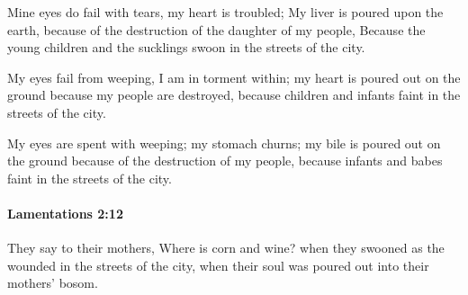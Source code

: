 			\begin{versebox}
					\item[BHS] 
					\item[LXX] 
					\item[ASV] Mine eyes do fail with tears, my heart is troubled; My liver is poured upon the earth, because of the destruction of the daughter of my people, Because the young children and the sucklings swoon in the streets of the city.
					\item[NIV] My eyes fail from weeping, I am in torment within; my heart is poured out on the ground because my people are destroyed, because children and infants faint in the streets of the city.
					\item[NRSV] My eyes are spent with weeping; my stomach churns; my bile is poured out on the ground because of the destruction of my people, because infants and babes faint in the streets of the city.
			\end{versebox}

		\paragraph{Lamentations 2:12} %
			\label{LAMENTATIONS-2-12}

			They say to their mothers, Where is corn and wine? when they swooned as the wounded in the streets of the city, when their soul was poured out into their mothers’ bosom.


